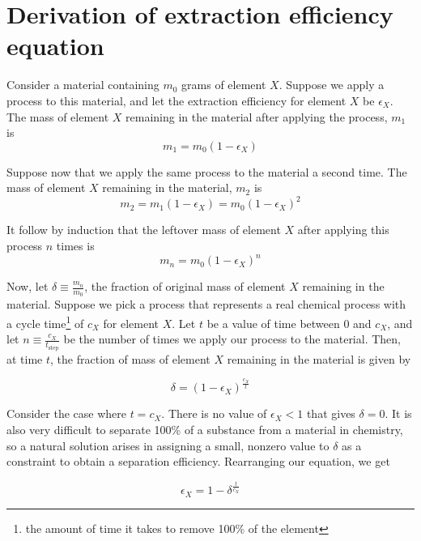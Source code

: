 \chapter{Derivation of extraction efficiency equation}
\label{appex:extraction-efficiency}

Consider a material containing $m_0$ grams of element $X$. Suppose we apply
a process to this material, and let the extraction efficiency for element $X$ be
$\epsilon_{X}$. The mass of element $X$ remaining in the material after applying
the process, $m_{1}$ is
\begin{equation}
   m_{1} = m_0(1-\epsilon_{X}) 
\end{equation}

Suppose now that we apply the same process to the material a second time. The mass of element $X$ remaining in the material, $m_{2}$ is 
\begin{equation}
    m_{2} = m_{1}(1-\epsilon_{X}) = m_0(1-\epsilon_{X})^{2}
\end{equation}

It follow by induction that the leftover mass of element $X$ after applying this
process $n$ times is
\begin{equation}
    m_{n} = m_0(1-\epsilon_{X})^{n}
\end{equation}

Now, let $\delta \equiv \frac{m_{n}}{m_0}$, the fraction of original mass of
element $X$ remaining in the material. Suppose we pick a process that represents
a real chemical process with a cycle time\footnote{the amount of time it takes
to remove 100\% of the element} of $c_{X}$ for element $X$. Let $t$ be a value
of time between 0 and $c_{X}$, and let $n \equiv \frac{c_{X}}{t_\text{step}}$ be
the number of times we apply our process to the material. Then, at time $t$, the
fraction of mass of element $X$ remaining in the material is given by

\begin{equation}
    \delta = (1-\epsilon_{X})^{\frac{c_{X}}{t}}
\end{equation}

Consider the case where $t=c_{X}$. There is no value of $\epsilon_{X} < 1$ that
gives $\delta = 0$. It is also very difficult to separate 100\% of a substance
from a material in chemistry, so a natural solution arises in assigning a small,
nonzero value to $\delta$ as a constraint to obtain a separation efficiency.
Rearranging our equation, we get

\begin{equation}
    \epsilon_{X} = 1 - \delta^{\frac{t}{c_{X}}}
\end{equation}

